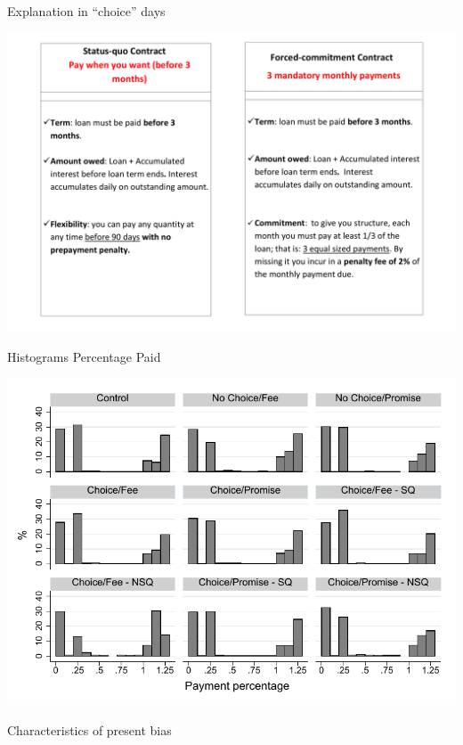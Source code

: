 \documentclass[9pt]{beamer}
\begin{document}
\begin{frame}{Explanation in ``choice'' days}
    \begin{center}
        \includegraphics[width=\textwidth]{Figuras/micas.pdf}
    \end{center}
\end{frame}


\begin{frame}{Histograms Percentage Paid}
    \begin{center}
        \includegraphics[width=.9\textwidth]{Figuras/hist_perc_payment.pdf}
    \end{center}
\end{frame}



\begin{frame}{Characteristics of present bias}
\begin{table}[H]
\label{pb_chars}
\begin{center}
\tiny{}
\end{center}
\end{table}
\end{frame}
\end{document}
